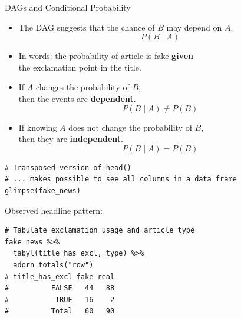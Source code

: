 \documentclass[12pt]{beamer}
\begin{document}
\begin{frame}{}
\begin{block}{DAGs and Conditional Probability}
\begin{itemize}
    \item The DAG suggests that the chance of \(B\) may depend on \(A\).
    \[
    P(B \mid A)
    \]
    \item[] In words: the probability of article is fake \textbf{given}\\
            \hspace{4cm}the exclamation point in the title.
    \item If \(A\) changes the probability of \(B\),\\
          \hspace{2cm}then the events are \textbf{dependent}.
    \[
    P(B \mid A) \neq P(B)
    \]
    \item If knowing \(A\) does not change the probability of \(B\),\\
          \hspace{5cm}then they are \textbf{independent}.
    \[
    P(B \mid A) = P(B)
    \]
\end{itemize}
\end{block}
\end{frame}

\begin{frame}[fragile]{}
\begin{verbatim}
# Transposed version of head()
# ... makes possible to see all columns in a data frame
glimpse(fake_news)
\end{verbatim}

\vspace{1.em}

Observed headline pattern:

\begin{verbatim}
# Tabulate exclamation usage and article type
fake_news %>% 
  tabyl(title_has_excl, type) %>% 
  adorn_totals("row")
# title_has_excl fake real
#          FALSE   44   88
#           TRUE   16    2
#          Total   60   90
\end{verbatim}
\end{frame}
\end{document}
